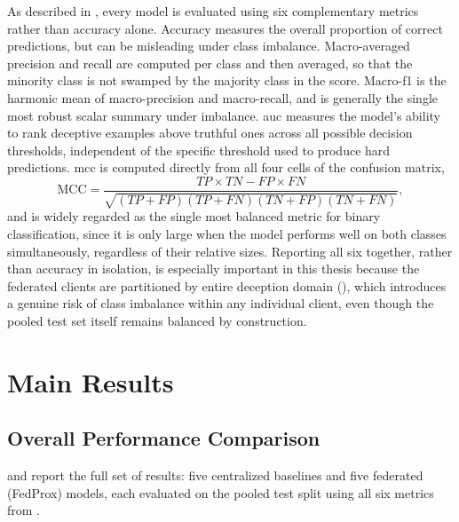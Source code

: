 As described in , every model is evaluated using six complementary metrics rather than accuracy alone. Accuracy measures the overall proportion of correct predictions, but can be misleading under class imbalance. Macro-averaged precision and recall are computed per class and then averaged, so that the minority class is not swamped by the majority class in the score. Macro-\gls{f1} is the harmonic mean of macro-precision and macro-recall, and is generally the single most robust scalar summary under imbalance. \gls{auc} measures the model's ability to rank deceptive examples above truthful ones across all possible decision thresholds, independent of the specific threshold used to produce hard predictions. \gls{mcc} is computed directly from all four cells of the confusion matrix,
\begin{equation}
\text{MCC} = \frac{TP \times TN - FP \times FN}{\sqrt{(TP+FP)(TP+FN)(TN+FP)(TN+FN)}},
\end{equation}
and is widely regarded as the single most balanced metric for binary classification, since it is only large when the model performs well on both classes simultaneously, regardless of their relative sizes. Reporting all six together, rather than accuracy in isolation, is especially important in this thesis because the federated clients are partitioned by entire deception domain (), which introduces a genuine risk of class imbalance within any individual client, even though the pooled test set itself remains balanced by construction.

\section{Main Results}
\label{sec:main-results}

\subsection{Overall Performance Comparison}
\label{sec:overall-comparison}

 and  report the full set of results: five centralized baselines and five federated (FedProx) models, each evaluated on the pooled test split using all six metrics from .

